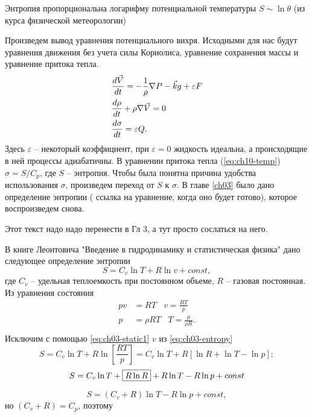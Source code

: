 \begin{info}
    Энтропия пропорциональна логарифму потенциальной температуры $S \sim \ln{\theta}$ (из курса физической метеорологии) 
\end{info}

Произведем вывод уравнения потенциального вихря. Исходными для нас будут уравнения движения без учета силы Кориолиса, уравнение сохранения массы и уравнение притока тепла. 
\begin{align}
    &\displaystyle\frac{d \vec{V}}{d t} = -\frac{1}{\rho} \nabla P - \vec{k}g + \varepsilon F \label{eq:ch10-dudt_vec} \\
    &\displaystyle\frac{d \rho}{d t}+\rho \nabla \Vec{V}=0 \label{eq:ch10-masscons} \\
    &\displaystyle\frac{d \sigma}{d t} = \varepsilon Q \label{eq:ch10-temp}.
\end{align}
Здесь $\varepsilon$ -- некоторый коэффициент, при $\varepsilon=0$ жидкость идеальна, а происходящие в ней процессы адиабатичны. В уравнении притока тепла (\ref{eq:ch10-temp}) $\sigma=S/C_p$, где $S$ -- энтропия. Чтобы была понятна причина удобства использования $\sigma$, произведем переход от $S$ к $\sigma$. В главе \ref{ch03} было дано определение энтропии ({\color{red} ссылка на уравнение, когда оно будет готово}), которое воспроизведем снова.
\begin{warn}
    Этот текст надо надо перенести в Гл 3, а тут просто сослаться на него. 
\end{warn}
{\color{red}
В книге Леонтовича "Введение в гидродинамику и статистическая физика" дано следующее определение энтропии
\begin{equation}
    S = C_v \ln{T} + R \ln{v} + const, \label{eq:ch03-entropy}
\end{equation}
где $C_v$ -- удельная теплоемкость при постоянном объеме, $R$ -- газовая постоянная. Из уравнения состояния 
\begin{align}
    pv &= RT \:\:\:\: v=\frac{RT}{p} \label{eq:ch03-static1} \\
    p & =\rho R T \:\:\:\: T=\frac{p}{\rho R} \label{eq:ch03-static2}. \\
\end{align}
Исключим с помощью \ref{eq:ch03-static1} $v$ из \ref{eq:ch03-entropy}
    \[ S = C_v \ln{T} + R \ln{ \left[ \frac{RT}{p} \right]} = C_v \ln{T} + R \left[ \ln{R} + \ln{T} - \ln{p} \right]; \]
    \[ S = C_v \ln{T} +  \boxed{R \tikzmark{z1}\ln{R}}  + R \ln{T} - R \ln{p} +  co\tikzmark{z2}nst \]
    \[ S = ( C_v + R) \ln{T} - R \ln{p} + const,  \]
но $(C_v+R)=C_p$, поэтому
}
